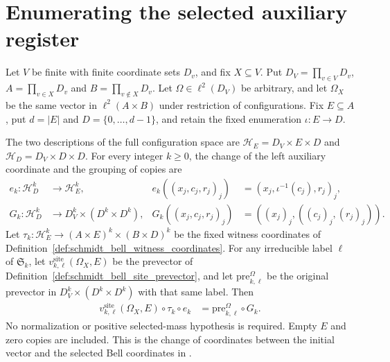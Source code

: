 \section{Enumerating the selected auxiliary register}

\begin{theorem}
    \label{thm:schmidt_bell_enumerated_prevector}
    \leanok
    Let $V$ be finite with finite coordinate sets $D_v$, and fix
    $X\subseteq V$. Put $D_V=\prod_{v\in V}D_v$,
    $A=\prod_{v\in X}D_v$ and $B=\prod_{v\notin X}D_v$.
    Let $\Omega\in\ell^2(D_V)$ be arbitrary, and let $\Omega_X$ be
    the same vector in $\ell^2(A\times B)$ under restriction of
    configurations. Fix $E\subseteq A$, put $d=|E|$ and
    $D=\{0,\ldots,d-1\}$, and retain the fixed enumeration
    $\iota:E\to D$.

    The two descriptions of the full configuration space are
    $\mathcal H_E=D_V\times E\times D$ and
    $\mathcal H_D=D_V\times D\times D$.
    For every integer $k\geq0$, the change of the left auxiliary
    coordinate and the grouping of copies are
    \begin{align*}
        e_k:\mathcal H_D^k&\longrightarrow\mathcal H_E^k,
        &e_k((x_j,c_j,r_j)_j)&=(x_j,\iota^{-1}(c_j),r_j)_j,\\
        G_k:\mathcal H_D^k&\longrightarrow D_V^k\times(D^k\times D^k),
        &G_k((x_j,c_j,r_j)_j)&=((x_j)_j,((c_j)_j,(r_j)_j)).
    \end{align*}
    Let $\tau_k:\mathcal H_E^k\to(A\times E)^k\times(B\times D)^k$
    be the fixed witness coordinates of
    Definition~\ref{def:schmidt_bell_witness_coordinates}.
    For any irreducible label $\ell$ of $\mathfrak S_k$, let
    $v^{\mathrm{site}}_{k,\ell}(\Omega_X,E)$ be the prevector of
    Definition~\ref{def:schmidt_bell_site_prevector}, and let
    $\mathrm{pre}_{k,\ell}^{\Omega}$ be the original prevector in
    $D_V^k\times(D^k\times D^k)$ with that same label. Then
    \begin{align*}
        v^{\mathrm{site}}_{k,\ell}(\Omega_X,E)\circ\tau_k\circ e_k
        &=\mathrm{pre}_{k,\ell}^{\Omega}\circ G_k.
    \end{align*}
    No normalization or positive selected-mass hypothesis is required.
    Empty $E$ and zero copies are included. This is the change of
    coordinates between the initial vector and the selected Bell
    coordinates in
    \cite[Section~8, lines~130--147, 240--254 and~283--290]{OpenAI2026AreaLaw}.
\end{theorem}
